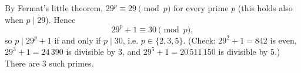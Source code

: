By Fermat's little theorem, $29^p\equiv29\pmod p$ for every prime $p$ (this holds also when $p\mid29$). Hence
\[29^p+1\equiv30\pmod p,\]
so $p\mid29^p+1$ if and only if $p\mid30$, i.e. $p\in\{2,3,5\}$. (Check: $29^2+1=842$ is even, $29^3+1=24\,390$ is divisible by $3$, and $29^5+1=20\,511\,150$ is divisible by $5$.) There are $\boxed{3}$ such primes.
